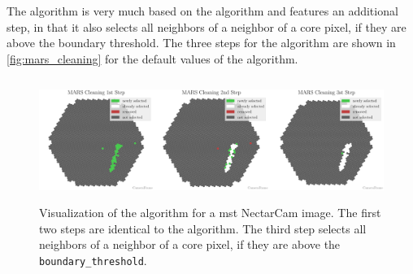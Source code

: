 The \mars{} algorithm \cite{mars} is very much based on the \tailcuts{}
algorithm and features an additional step, in that it also selects all neighbors of a neighbor of a
core pixel, if they are above the boundary threshold. The three steps for the \mars{} algorithm
are shown in \autoref{fig:mars_cleaning} for the default values of the algorithm.

\begin{figure}
    \centering
    \includegraphics[height=4cm]{plots/cleaner_steps/mars.pdf}
    \caption{Visualization of the \mars{} algorithm for a \gls{mst} NectarCam image. The first two
    steps are identical to the \tailcuts{} algorithm. The third step selects all neighbors of a neighbor of a
    core pixel, if they are above the \texttt{boundary\_threshold}.}
    \label{fig:mars_cleaning}
\end{figure}


